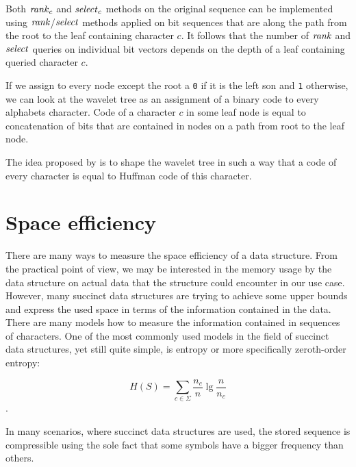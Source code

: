 Both $\mathit{rank}_c$ and $\mathit{select}_c$ methods on the original sequence can be implemented
using $\mathit{rank}$/$\mathit{select}$ methods applied on bit sequences that are along the path
from the root to the leaf containing character $c$. It follows that the number of
$\mathit{rank}$ and $\mathit{select}$ queries on individual bit vectors depends on the depth of
a leaf containing queried character $c$.

If we assign to every node except the root a {\tt 0} if it is the left son and {\tt 1}
otherwise, we can look at the wavelet tree as an assignment of a binary code to every
alphabets character. Code of a character $c$ in some leaf node is equal to concatenation of
bits that are contained in nodes on a path from root to the leaf node.

The idea proposed by \cite{makinen2005succinct} is to shape the wavelet tree in such a way
that a code of every character is equal to Huffman code of this character.


\section{Space efficiency}

There are many ways to measure the space efficiency of a data structure. From the
practical point of view, we may be interested in the memory usage by the data
structure on actual data that the structure could encounter in our use case. However,
many succinct data structures are trying to achieve some upper bounds and express
the used space in terms of the information contained in the data. There are many
models how to measure the information contained in sequences of characters. One
of the most commonly used models in the field of succinct data structures, yet still
quite simple, is entropy or more specifically zeroth-order entropy:

$$H(S)=\sum_{c\in\Sigma} \frac{n_c}{n} \lg \frac{n}{n_c}$$.

In many scenarios, where succinct data structures are used, the stored sequence
is compressible using the sole fact that some symbols have a bigger frequency than others.